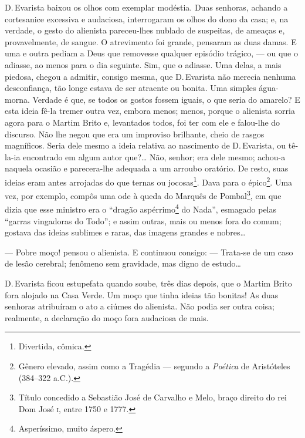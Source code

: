 D.\,Evarista baixou os olhos com exemplar modéstia. Duas senhoras,
achando a cortesanice excessiva e audaciosa, interrogaram os olhos do
dono da casa; e, na verdade, o gesto do alienista pareceu-lhes nublado
de suspeitas, de ameaças e, provavelmente, de sangue. O atrevimento foi
grande, pensaram as duas damas. E uma e outra pediam a Deus que
removesse qualquer episódio trágico, --- ou que o adiasse, ao menos para
o dia seguinte. Sim, que o adiasse. Uma delas, a mais piedosa, chegou a
admitir, consigo mesma, que D.\,Evarista não merecia nenhuma
desconfiança, tão longe estava de ser atraente ou bonita. Uma simples
água-morna. Verdade é que, se todos os gostos fossem iguais, o que seria
do amarelo? E esta ideia fê-la tremer outra vez, embora menos; menos,
porque o alienista sorria agora para o Martim Brito e, levantados todos,
foi ter com ele e falou-lhe do discurso. Não lhe negou que era um
improviso brilhante, cheio de rasgos magníficos. Seria dele mesmo a
ideia relativa ao nascimento de D.\,Evarista, ou tê-la-ia encontrado em
algum autor que?\ldots{} Não, senhor; era dele mesmo; achou-a naquela
ocasião e parecera-lhe adequada a um arroubo oratório. De resto, suas
ideias eram antes arrojadas do que ternas ou jocosas\footnote{Divertida,
  cômica.}. Dava para o épico\footnote{Gênero elevado, assim como a
  Tragédia --- segundo a \emph{Poética} de Aristóteles (384--322 a.C.).}.
Uma vez, por exemplo, compôs uma ode à queda do Marquês de
Pombal\footnote{Título concedido a Sebastião José de Carvalho e Melo,
  braço direito do rei Dom José \textsc{i}, entre 1750 e 1777.}, em que dizia que
esse ministro era o ``dragão aspérrimo\footnote{Asperíssimo, muito
  áspero.} do Nada'', esmagado pelas ``garras vingadoras do Todo''; e
assim outras, mais ou menos fora do comum; gostava das ideias sublimes e
raras, das imagens grandes e nobres\ldots{}

--- Pobre moço! pensou o alienista. E continuou consigo: --- Trata-se de
um caso de lesão cerebral; fenômeno sem gravidade, mas digno de
estudo\ldots{}

D.\,Evarista ficou estupefata quando soube, três dias depois, que o
Martim Brito fora alojado na Casa Verde. Um moço que tinha ideias tão
bonitas! As duas senhoras atribuíram o ato a ciúmes do alienista. Não
podia ser outra coisa; realmente, a declaração do moço fora audaciosa de
mais.

